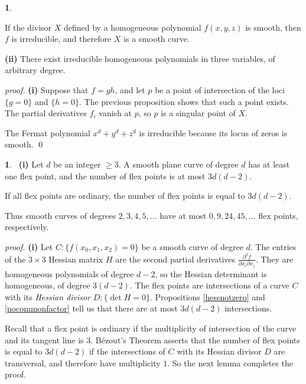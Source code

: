 \documentclass[leqno]{book}
\newcommand\Marginnote[1]{\marginnote{\hspace{-12pt}\normalfont{#1}}}
\theoremstyle{definition}%
\numberwithin{equation}{section}
\theoremstyle{theorem} %
\newtheorem{corollary}[equation]{}
\renewenvironment{proof}{\no \emph{proof.}}{}
\begin{document}
\begin{corollary}{}\Marginnote{smoothirred}\;\,

 If the divisor $X$ defined by a homogeneous polynomial
$f(x,y,z)$ is smooth, then $f$ is irreducible, and therefore $X$ is a
smooth  curve.

\noindent
{\bf (ii)} There exist irreducible
homogeneous polynomials in three variables, of arbitrary degree.
\label{smoothirred} \end{corollary}
 

\begin{proof} {\bf (i)} Suppose that $f= gh$, and let $p$ be a point of
intersection of the loci $\{g=0\}$ and $\{h=0\}$.  The previous
proposition shows that such a point exists.  The partial derivatives
$f_i$ vanish at $p$, so $p$ is a singular point of $X$.

 The Fermat polynomial $x^d+y^d+z^d$ is irreducible
because its locus of zeros is smooth.  \qed\end{proof}

\begin{corollary}{}\Marginnote{numberofflexes}\;\,
{\bf (i)} Let $d$ be an integer $\geq 3$.  A smooth 
plane curve of degree $d$ has at least one flex point, and the
number of flex points is at most $3d(d\!-\! 2)$.

 If all flex points are ordinary, the number of flex
points is equal to $3d(d\!-\! 2)$.
\label{numberofflexes} \end{corollary}

\no
 Thus  smooth curves of degrees
$2,3,4,5,...$ have at most $0,9,24,45,...$ flex points, respectively.

\begin{proof} {\bf (i)} Let $C: \{f(x_0,x_1,x_2)=0\}$ be a
smooth curve of degree $d$.  The entries of the $3\times 3$ Hessian
matrix $H$ are the second partial derivatives $\frac
{\partial^2f}{\partial x_i\partial x_j}$.  They are homogeneous
polynomials of degree $d\!-\! 2$, so the Hessian determinant is
homogeneous, of degree $3(d\!-\! 2)$.  The flex points are
intersections of a curve $C$ with its {\it Hessian divisor} $D:\{\det
H=0\}$.  Propositions \ref{hessnotzero} and \ref{nocommonfactor} tell
us that there are at most $3d(d\!-\! 2)$ intersections.

 Recall that a flex point is ordinary if the
multiplicity of intersection of the curve and its tangent line is $3$.
B\'ezout's Theorem asserts that the number of flex points is equal to
$3d(d\!-\! 2)$ if the intersections of $C$ with its Hessian divisor
$D$ are transversal, and therefore have multiplicity $1$.  So the next
lemma completes the proof.\end{proof}
\end{document}
